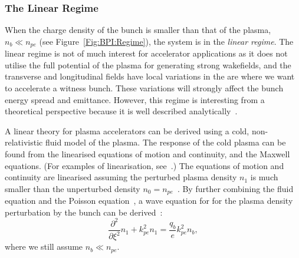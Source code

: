 \subsubsection{The Linear Regime}
\label{Int:BPI:Lin}

When the charge density of the bunch is smaller than that of the plasma, $n_{b} \ll n_{pe}$ (see Figure~\ref{Fig:BPI:Regime}), the system is in the \textit{linear regime}.
The linear regime is not of much interest for accelerator applications as it does not utilise the full potential of the plasma for generating strong wakefields, and the transverse and longitudinal fields have local variations in the are where we want to accelerate a witness bunch.
These variations will strongly affect the bunch energy spread and emittance.
However, this regime is interesting from a theoretical perspective because it is well described analytically~\cite{muggli:2017}.

A linear theory for plasma accelerators can be derived using a cold, non-relativistic fluid model of the plasma.
The response of the cold plasma can be found from the linearised equations of motion and continuity, and the Maxwell equations. (For examples of linearisation, see~\cite{pecseli:2012,chen:1974}.)
The equations of motion and continuity are linearised assuming the perturbed plasma density $n_{1}$ is much smaller than the unperturbed density $n_{0} = n_{pe}$~\cite{chen:1987}.
By further combining the fluid equation and the Poisson equation~\cite{katsouleas:1987}, a wave equation for for the plasma density perturbation by the bunch can be derived~\cite{chen:1987,muggli:2017}:
\begin{equation}
    \frac{\partial^{2}}{\partial\xi^{2}}n_{1} + k_{pe}^{2}n_{1} = \frac{q_{b}}{e}k_{pe}^{2}n_{b}, \label{EQ:BeamPlasmaWF}
\end{equation}
where we still assume $n_{b} \ll n_{pe}$.

